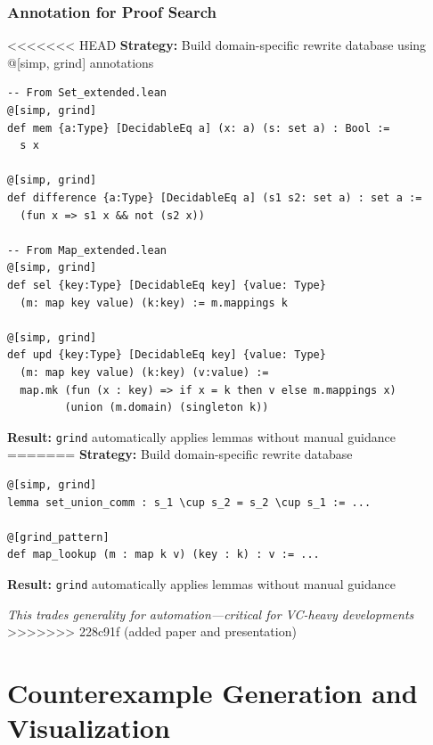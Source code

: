 \documentclass[usepdftitle=false]{beamer}
\begin{document}
\begin{frame}[fragile]
  \frametitle{Annotation for Proof Search}
  
<<<<<<< HEAD
  \textbf{Strategy:} Build domain-specific rewrite database using @[simp, grind] annotations
  
  \vspace{0.2cm}
  \small
  \begin{lstlisting}[style=leanstyle,basicstyle=\tiny\ttfamily]
-- From Set_extended.lean
@[simp, grind]
def mem {a:Type} [DecidableEq a] (x: a) (s: set a) : Bool :=
  s x

@[simp, grind]
def difference {a:Type} [DecidableEq a] (s1 s2: set a) : set a :=
  (fun x => s1 x && not (s2 x))

-- From Map_extended.lean
@[simp, grind]
def sel {key:Type} [DecidableEq key] {value: Type}
  (m: map key value) (k:key) := m.mappings k

@[simp, grind]
def upd {key:Type} [DecidableEq key] {value: Type}
  (m: map key value) (k:key) (v:value) :=
  map.mk (fun (x : key) => if x = k then v else m.mappings x)
         (union (m.domain) (singleton k))
  \end{lstlisting}
  
  \vspace{0.2cm}
  \textbf{Result:} \texttt{grind} automatically applies lemmas without manual guidance\vspace{0.1cm}
=======
  \textbf{Strategy:} Build domain-specific rewrite database
  
  \begin{lstlisting}[style=leanstyle]
@[simp, grind]
lemma set_union_comm : s_1 \cup s_2 = s_2 \cup s_1 := ...

@[grind_pattern]
def map_lookup (m : map k v) (key : k) : v := ...
  \end{lstlisting}
  
  \vspace{0.3cm}
  \textbf{Result:} \texttt{grind} automatically applies lemmas without manual guidance
  
  \vspace{0.3cm}
  \textit{This trades generality for automation—critical for VC-heavy developments}
>>>>>>> 228c91f (added paper and presentation)
\end{frame}

\section{Counterexample Generation and Visualization}
\end{document}
